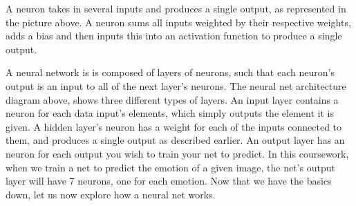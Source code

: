 A neuron takes in several inputs and produces a single output, as represented in the picture above.
A neuron sums all inputs weighted by their respective weights,
adds a bias and then inputs this into an activation function to produce a single output.

A neural network is is composed of layers of neurons,
such that each neuron's output is an input to all of the next layer's neurons.
The neural net architecture diagram above, shows three different types of layers.
An input layer contains a neuron for each data input's elements, which simply outputs the element it is given.
A hidden layer's neuron has a weight for each of the inputs connected to them,
and produces a single output as described earlier.
An output layer has an neuron for each output you wish to train your net to predict.
In this coursework, when we train a net to predict the emotion of a given image,
the net's output layer will have 7 neurons, one for each emotion.
Now that we have the basics down, let us now explore how a neural net works.

